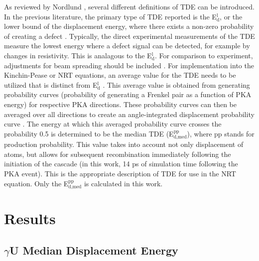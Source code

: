 \documentclass[review]{elsarticle}
\begin{document}
As reviewed by Nordlund \cite{nordlund2006}, several different definitions of TDE can be introduced. In the previous literature, the primary type of TDE reported is the E$^{\textrm{l}}_{\textrm{d}}$, or the lower bound of the displacement energy, where there exists a non-zero probability of creating a defect \cite{malerba2002}. Typically, the direct experimental measurements of the TDE measure the lowest energy where a defect signal can be detected, for example by changes in resistivity. This is analagous to the E$^{\textrm{l}}_{\textrm{d}}$. For comparison to experiment, adjustments for beam spreading should be included \cite{nordlund2006}. For implementation into the Kinchin-Pease or NRT equations, an average value for the TDE needs to be utilized that is distinct from E$^{\textrm{l}}_{\textrm{d}}$ \cite{nordlund2006,norgett1975}. This average value is obtained from generating probability curves (probability of generating a Frenkel pair as a function of PKA energy) for respective PKA directions. These probability curves can then be averaged over all directions to create an angle-integrated displacement probability curve \cite{nordlund2006}. The energy at which this averaged probability curve crosses the probability 0.5 is determined to be the median TDE (E$^{\textrm{pp}}_{\textrm{d,med}}$), where pp stands for production probability. This value takes into account not only displacement of atoms, but allows for subsequent recombination immediately following the initiation of the cascade (in this work, 14 ps of simulation time following the PKA event). This is the appropriate description of TDE for use in the NRT equation. Only the E$^{\textrm{pp}}_{\textrm{d,med}}$ is calculated in this work.

\section{Results}
\subsection{$\gamma$U Median Displacement Energy}
\end{document}
